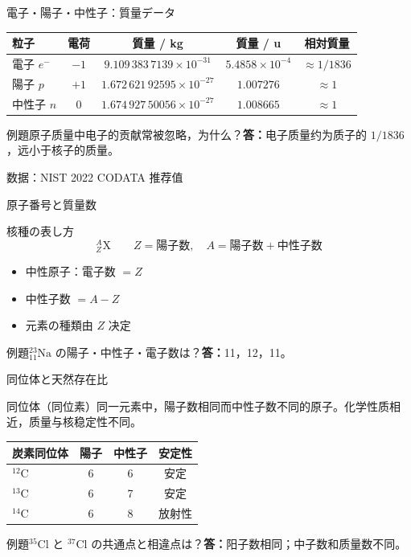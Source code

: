 \documentclass[notheorems,aspectratio=169]{beamer}
\newcommand{\ans}[1]{\textcolor{ChemGreen}{\textbf{答：}#1}}
\begin{document}
\begin{frame}{電子・陽子・中性子：質量データ}
\scriptsize\centering
\begin{tabular}{lcccc}\toprule 粒子 & 電荷 & 質量 / kg & 質量 / u & 相対質量\\\midrule
電子 $e^-$ & $-1$ & $9.109\,383\,7139\times10^{-31}$ & $5.4858\times10^{-4}$ & $\approx1/1836$\\
陽子 $p$ & $+1$ & $1.672\,621\,92595\times10^{-27}$ & $1.007276$ & $\approx1$\\
中性子 $n$ & $0$ & $1.674\,927\,50056\times10^{-27}$ & $1.008665$ & $\approx1$\\\bottomrule\end{tabular}
\begin{exampleblock}{例題}原子质量中电子的贡献常被忽略，为什么？\quad \ans{电子质量约为质子的 $1/1836$，远小于核子的质量。}\end{exampleblock}
\begin{flushright}\tiny 数据：NIST 2022 CODATA 推荐值\end{flushright}
\end{frame}

\begin{frame}{原子番号と質量数}
\begin{block}{核種の表し方}\[{}^{A}_{Z}\mathrm{X}\qquad Z=\text{陽子数},\quad A=\text{陽子数}+\text{中性子数}\]\end{block}
\begin{itemize}\item 中性原子：電子数 $=Z$\item 中性子数 $=A-Z$\item 元素の種類由 $Z$ 决定\end{itemize}
\begin{exampleblock}{例題}${}^{23}_{11}\mathrm{Na}$ の陽子・中性子・電子数は？\quad \ans{11，12，11。}\end{exampleblock}
\end{frame}

\begin{frame}{同位体と天然存在比}
\begin{block}{同位体（同位素）}同一元素中，陽子数相同而中性子数不同的原子。化学性质相近，质量与核稳定性不同。\end{block}
\centering\begin{tabular}{lccc}\toprule 炭素同位体 & 陽子 & 中性子 & 安定性\\\midrule ${}^{12}$C & 6&6&安定\\ ${}^{13}$C&6&7&安定\\ ${}^{14}$C&6&8&放射性\\\bottomrule\end{tabular}
\begin{exampleblock}{例題}${}^{35}$Cl と ${}^{37}$Cl の共通点と相違点は？\quad \ans{阳子数相同；中子数和质量数不同。}\end{exampleblock}
\end{frame}
\end{document}
